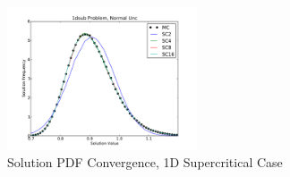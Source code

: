 \begin{figure}[h!]
\centering
   \includegraphics[width=0.5\textwidth]{../graphics/1dsub_normal_pdfs}
   \caption{Solution PDF Convergence, 1D Supercritical Case}
      \label{fig:1dsub}
\end{figure}


%
%
